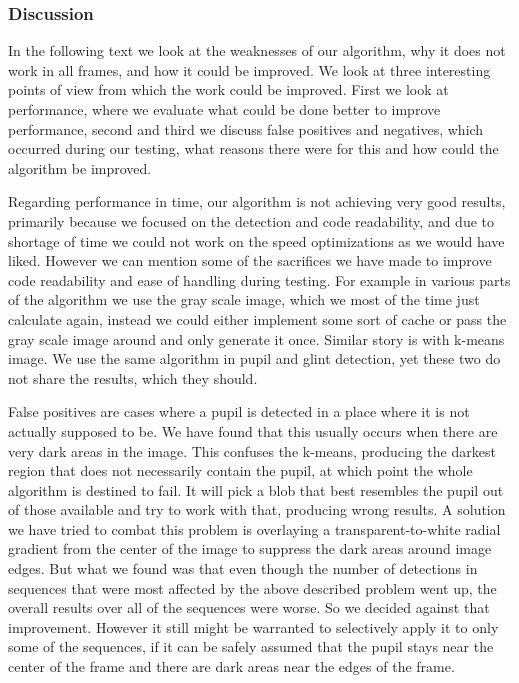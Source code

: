 \subsubsection{Discussion}
In the following text we look at the weaknesses of our algorithm, why it does not work in all frames, and how it could be improved. We look at three interesting points of view from which the work could be improved. First we look at performance, where we evaluate what could be done better to improve performance, second and third we discuss false positives and negatives, which occurred during our testing, what reasons there were for this and how could the algorithm be improved.

Regarding performance in time, our algorithm is not achieving very good results, primarily because we focused on the detection and code readability, and due to shortage of time we could not work on the speed optimizations as we would have liked. However we can mention some of the sacrifices we have made to improve code readability and ease of handling during testing. 
For example in various parts of the algorithm we use the gray scale image, which we most of the time just calculate again, instead we could either implement some sort of cache or pass the gray scale image around and only generate it once. Similar story is with k-means image. We use the same algorithm in pupil and glint detection, yet these two do not share the results, which they should.

False positives are cases where a pupil is detected in a place where it is not actually supposed to be. We have found that this usually occurs when there are very dark areas in the image. This confuses the k-means, producing the darkest region that does not necessarily contain the pupil, at which point the whole algorithm is destined to fail. It will pick a blob that best resembles the pupil out of those available and try to work with that, producing wrong results. 
A solution we have tried to combat this problem is overlaying a transparent-to-white radial gradient from the center of the image to suppress the dark areas around image edges. But what we found was that even though the number of detections in sequences that were most affected by the above described problem went up, the overall results over all of the sequences were worse. So we decided against that improvement. However it still might be warranted to selectively apply it to only some of the sequences, if it can be safely assumed that the pupil stays near the center of the frame and there are dark areas near the edges of the frame.

